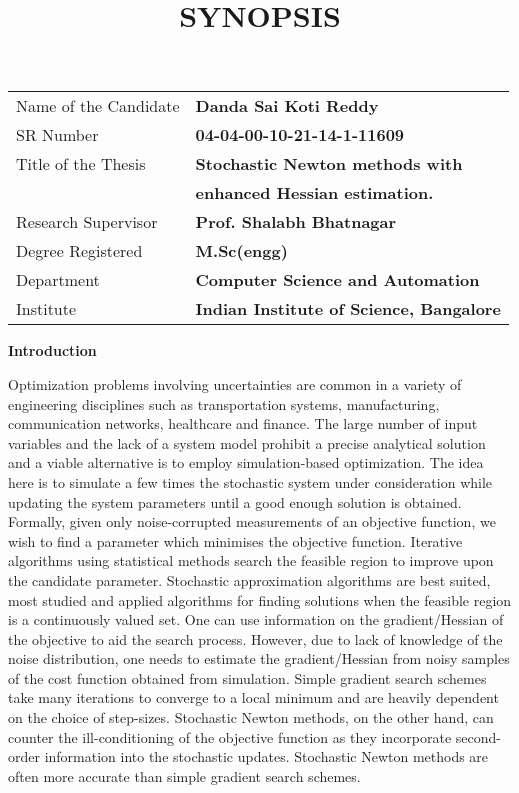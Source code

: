 \documentclass[12pt]{article}
\title{\textbf{SYNOPSIS}}
\author{}
\date{}
\begin{document}
\maketitle
\begin{tabular}{ll}
Name of the Candidate & \textbf{Danda Sai Koti Reddy}\\ 
SR Number &\textbf{04-04-00-10-21-14-1-11609} \\
Title of the Thesis & \textbf{Stochastic Newton methods with   } \\
 & \textbf{ enhanced Hessian estimation.}\\
 Research Supervisor  & \textbf{Prof. Shalabh Bhatnagar} \\
Degree Registered  &  \textbf{M.Sc(engg)} \\
Department  & \textbf{Computer Science and Automation} \\
Institute  & \textbf{Indian Institute of Science, Bangalore }
\end{tabular}


\vspace{2cm}

\begin{center}

\textbf{\large{Introduction}}
\end{center}



Optimization problems involving uncertainties are common in a variety
of engineering disciplines such as transportation systems, manufacturing,
communication networks, healthcare and finance. The large number of input
variables and the lack of a system model prohibit a precise analytical
solution and a viable alternative is to employ simulation-based
optimization. The idea here is to simulate a few times the stochastic
system under consideration while updating the system parameters until a
good enough solution is obtained.\\


Formally, given only noise-corrupted measurements of an
objective function, we wish to find a parameter which minimises the
objective function. Iterative algorithms using statistical methods search
the feasible region to improve upon the candidate parameter. Stochastic
approximation algorithms are best suited, most studied and applied
algorithms for finding solutions when the feasible region is a
continuously valued set. One can use information on the gradient/Hessian
of the objective to aid the search process. However, due to lack of
knowledge of the noise distribution, one needs to estimate the
gradient/Hessian from noisy samples of the cost function obtained from
simulation. Simple gradient search schemes take many iterations to
converge to a local minimum and are heavily dependent on the choice of
step-sizes. Stochastic Newton methods, on the other hand, can counter the
ill-conditioning of the objective function as they incorporate
second-order information into the stochastic updates. Stochastic Newton
methods are often more accurate than simple gradient search schemes.\\
\end{document}

